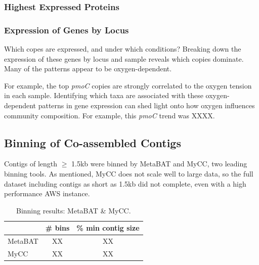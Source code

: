 \subsubsection{Highest Expressed Proteins}

\subsubsection{Expression of Genes by Locus}

Which copes are expressed, and under which conditions?
Breaking down the expression of these genes by locus and sample reveals which copies dominate.
Many of the patterns appear to be oxygen-dependent.

For example, the top \textit{pmoC} copies are strongly correlated to the oxygen tension in each sample.
Identifying which taxa are associated with these oxygen-dependent patterns in gene expression can shed light onto how oxygen influences community composition.
For example, this \textit{pmoC} trend was XXXX. %


\subsection{Binning of Co-assembled Contigs}

Contigs of length $\geq$ 1.5kb were binned by MetaBAT and MyCC, two leading binning tools.
As mentioned, MyCC does not scale well to large data, so the full dataset including contigs as short as 1.5kb did not complete, even with a high performance AWS instance.

\begin{table}[H]
\centering
\begin{singlespace}
\caption[Binning results: MetaBAT \& MyCC]
	{Binning results: MetaBAT \& MyCC.}
\label{table:sample_read_sizes}
\begin{tabular}{l | cc}
            & \# bins & \% min contig size \\  %
\midrule
	MetaBAT & XX   & XX \\
	MyCC    & XX   & XX \\
\end{tabular}
\end{singlespace}
\end{table}

